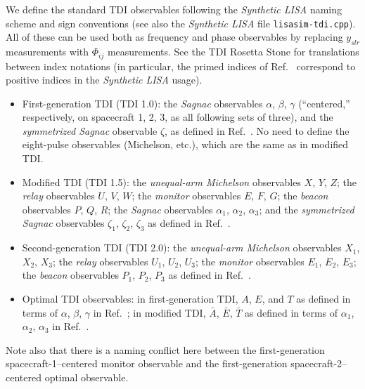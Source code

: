 \documentclass[11pt]{report}
\begin{document}
We define the standard TDI observables following the \emph{Synthetic LISA} \cite{synthlisa,vallis2005} naming scheme
and sign conventions (see also the \emph{Synthetic LISA} file \texttt{lisasim-tdi.cpp}). All of these can be used both
as frequency and phase observables by replacing $y_{slr}$ measurements with $\Phi_{ij}$ measurements. See the TDI
Rosetta Stone \cite{rosetta} for translations between index notations (in particular, the primed indices of
Ref.\ \cite{secondgen} correspond to positive indices in the \emph{Synthetic LISA} usage). 
%
\begin{itemize}
%
\item First-generation TDI (TDI 1.0): the \emph{Sagnac} observables $\alpha$, $\beta$, $\gamma$ (``centered,'' respectively, on spacecraft 1, 2, 3, as all following sets of three), and the \emph{symmetrized Sagnac} observable $\zeta$, as defined in Ref.\ \cite{firstgen}. No need to define the eight-pulse observables (Michelson, etc.), which are the same as in modified TDI.
%
\item Modified TDI (TDI 1.5): the \emph{unequal-arm Michelson} observables $X$, $Y$, $Z$;
the \emph{relay} observables $U$, $V$, $W$; the \emph{monitor} observables $E$, $F$, $G$; the \emph{beacon} observables $P$, $Q$, $R$; the \emph{Sagnac} observables $\alpha_1$, $\alpha_2$, $\alpha_3$; and the \emph{symmetrized Sagnac} observables $\zeta_1$, $\zeta_2$, $\zeta_3$ as defined in Ref.\ \cite{secondgen}.
%
\item Second-generation TDI (TDI 2.0): the \emph{unequal-arm Michelson} observables $X_1$, $X_2$, $X_3$;
the \emph{relay} observables $U_1$, $U_2$, $U_3$; the \emph{monitor} observables $E_1$, $E_2$, $E_3$; the \emph{beacon} observables $P_1$, $P_2$, $P_3$ as defined in Ref.\ \cite{secondgen}.
%
\item Optimal TDI observables: in first-generation TDI, $A$, $E$, and $T$ as defined in terms of $\alpha$, $\beta$, $\gamma$ in Ref.\ \cite{optimal}; in modified TDI, $\bar{A}$, $\bar{E}$, $\bar{T}$ as defined in terms of $\alpha_1$, $\alpha_2$, $\alpha_3$ in Ref.\ \cite{ktv}.
%
\end{itemize}
%
Note also that there is a naming conflict here between the first-generation spacecraft-1--centered monitor
observable and the first-generation spacecraft-2--centered optimal observable. 
\end{document}
